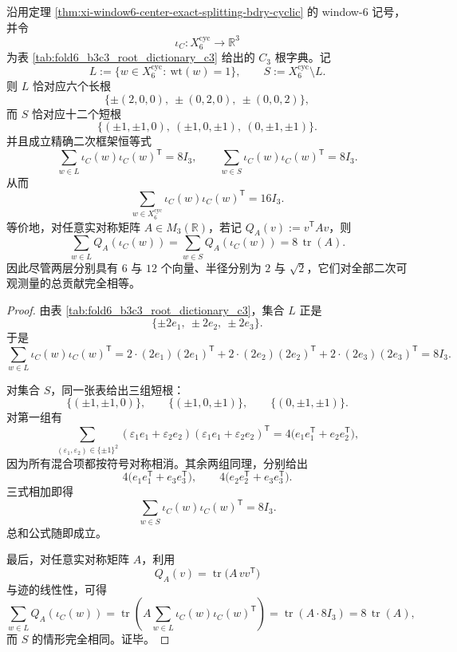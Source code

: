 \begin{theorem}\label{thm:xi-window6-c3-quadratic-energy-equipartition}
沿用定理 \ref{thm:xi-window6-center-exact-splitting-bdry-cyclic} 的 window-\(6\) 记号，并令
\[
\iota_C:X_6^{\mathrm{cyc}}\to \mathbb R^3
\]
为表 \ref{tab:fold6_b3c3_root_dictionary_c3} 给出的 \(C_3\) 根字典。记
\[
L:=\{w\in X_6^{\mathrm{cyc}}:\ \mathrm{wt}(w)=1\},
\qquad
S:=X_6^{\mathrm{cyc}}\setminus L.
\]
则 \(L\) 恰对应六个长根
\[
\{\pm(2,0,0),\ \pm(0,2,0),\ \pm(0,0,2)\},
\]
而 \(S\) 恰对应十二个短根
\[
\{(\pm1,\pm1,0),\ (\pm1,0,\pm1),\ (0,\pm1,\pm1)\}.
\]
并且成立精确二次框架恒等式
\[
\boxed{\;
\sum_{w\in L}\iota_C(w)\iota_C(w)^{\mathsf T}=8I_3,\qquad
\sum_{w\in S}\iota_C(w)\iota_C(w)^{\mathsf T}=8I_3.\;}
\]
从而
\[
\boxed{\;
\sum_{w\in X_6^{\mathrm{cyc}}}\iota_C(w)\iota_C(w)^{\mathsf T}=16I_3.\;}
\]
等价地，对任意实对称矩阵 \(A\in M_3(\mathbb R)\)，若记 \(Q_A(v):=v^{\mathsf T}Av\)，则
\[
\boxed{\;
\sum_{w\in L}Q_A(\iota_C(w))
=
\sum_{w\in S}Q_A(\iota_C(w))
=
8\,\operatorname{tr}(A).\;}
\]
因此尽管两层分别具有 \(6\) 与 \(12\) 个向量、半径分别为 \(2\) 与 \(\sqrt2\)，它们对全部二次可观测量的总贡献完全相等。
\end{theorem}
\begin{proof}
由表 \ref{tab:fold6_b3c3_root_dictionary_c3}，集合 \(L\) 正是
\[
\{\pm 2e_1,\ \pm 2e_2,\ \pm 2e_3\}.
\]
于是
\[
\sum_{w\in L}\iota_C(w)\iota_C(w)^{\mathsf T}
=
2\cdot(2e_1)(2e_1)^{\mathsf T}
+2\cdot(2e_2)(2e_2)^{\mathsf T}
+2\cdot(2e_3)(2e_3)^{\mathsf T}
=
8I_3.
\]

对集合 \(S\)，同一张表给出三组短根：
\[
\{(\pm1,\pm1,0)\},
\qquad
\{(\pm1,0,\pm1)\},
\qquad
\{(0,\pm1,\pm1)\}.
\]
对第一组有
\[
\sum_{(\varepsilon_1,\varepsilon_2)\in\{\pm1\}^2}
(\varepsilon_1 e_1+\varepsilon_2 e_2)
(\varepsilon_1 e_1+\varepsilon_2 e_2)^{\mathsf T}
=
4\bigl(e_1e_1^{\mathsf T}+e_2e_2^{\mathsf T}\bigr),
\]
因为所有混合项都按符号对称相消。其余两组同理，分别给出
\[
4\bigl(e_1e_1^{\mathsf T}+e_3e_3^{\mathsf T}\bigr),
\qquad
4\bigl(e_2e_2^{\mathsf T}+e_3e_3^{\mathsf T}\bigr).
\]
三式相加即得
\[
\sum_{w\in S}\iota_C(w)\iota_C(w)^{\mathsf T}=8I_3.
\]
总和公式随即成立。

最后，对任意实对称矩阵 \(A\)，利用
\[
Q_A(v)=\operatorname{tr}\!\bigl(A\,vv^{\mathsf T}\bigr)
\]
与迹的线性性，可得
\[
\sum_{w\in L}Q_A(\iota_C(w))
=
\operatorname{tr}\!\left(
A\sum_{w\in L}\iota_C(w)\iota_C(w)^{\mathsf T}
\right)
=
\operatorname{tr}(A\cdot 8I_3)
=
8\,\operatorname{tr}(A),
\]
而 \(S\) 的情形完全相同。证毕。
\end{proof}

\endinput
